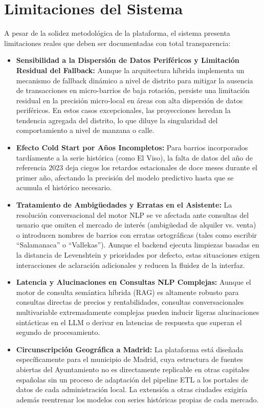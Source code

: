 \documentclass[a4paper,11pt,openany]{book}
\begin{document}
\section{Limitaciones del Sistema}
A pesar de la solidez metodológica de la plataforma, el sistema presenta limitaciones reales que deben ser documentadas con total transparencia:
\begin{itemize}
    \item \textbf{Sensibilidad a la Dispersión de Datos Periféricos y Limitación Residual del Fallback:} Aunque la arquitectura híbrida implementa un mecanismo de fallback dinámico a nivel de distrito para mitigar la ausencia de transacciones en micro-barrios de baja rotación, persiste una limitación residual en la precisión micro-local en áreas con alta dispersión de datos periféricos. En estos casos excepcionales, las proyecciones heredan la tendencia agregada del distrito, lo que diluye la singularidad del comportamiento a nivel de manzana o calle.
    \item \textbf{Efecto Cold Start por Años Incompletos:} Para barrios incorporados tardíamente a la serie histórica (como El Viso), la falta de datos del año de referencia 2023 deja ciegos los retardos estacionales de doce meses durante el primer año, afectando la precisión del modelo predictivo hasta que se acumula el histórico necesario.
    \item \textbf{Tratamiento de Ambigüedades y Erratas en el Asistente:} La resolución conversacional del motor NLP se ve afectada ante consultas del usuario que omiten el mercado de interés (ambigüedad de alquiler vs. venta) o introducen nombres de barrios con erratas ortográficas (tales como escribir ``Salamanaca'' o ``Vallekas''). Aunque el backend ejecuta limpiezas basadas en la distancia de Levenshtein y prioridades por defecto, estas situaciones exigen interacciones de aclaración adicionales y reducen la fluidez de la interfaz.
    \item \textbf{Latencia y Alucinaciones en Consultas NLP Complejas:} Aunque el motor de consulta semántica híbrida (RAG) es altamente robusto para consultas directas de precios y rentabilidades, consultas conversacionales multivariable extremadamente complejas pueden inducir ligeras alucinaciones sintácticas en el LLM o derivar en latencias de respuesta que superan el segundo de procesamiento.
    \item \textbf{Circunscripción Geográfica a Madrid:} La plataforma está diseñada específicamente para el municipio de Madrid, cuya estructura de fuentes abiertas del Ayuntamiento no es directamente replicable en otras capitales españolas sin un proceso de adaptación del pipeline ETL a los portales de datos de cada administración local. La extensión a otras ciudades exigiría además reentrenar los modelos con series históricas propias de cada mercado.
\end{itemize}
\end{document}
